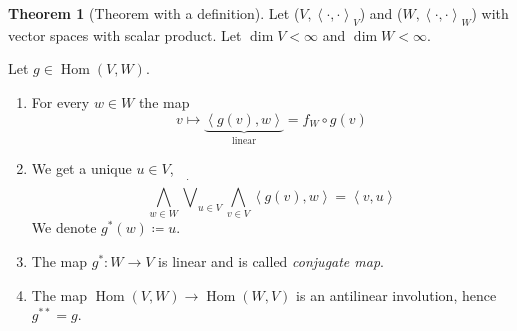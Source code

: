 \documentclass[a4paper,landscape,twocolumn]{article}
\newcommand\functional[1]{\left\langle{#1}\right\rangle}
\theoremstyle{definition}
\newtheorem{theorem}{Theorem}
\DeclareMathOperator\Hom{Hom} %
\begin{document}
\begin{theorem}[Theorem with a definition]
  Let ($V, \functional{\cdot,\cdot}_V$) and ($W, \functional{\cdot,\cdot}_W$) with vector spaces with scalar product.
  Let $\dim{V} < \infty$ and $\dim{W} < \infty$.

  Let $g \in \Hom(V, W)$.
  \begin{enumerate}
    \item For every $w \in W$ the map
      \[ v \mapsto \underbrace{\functional{g(v), w}}_{\text{linear}} = f_W \circ g(v) \]
    \item We get a unique $u \in V$,
      \[ \bigwedge_{w \in W} {\dot\bigvee}_{u \in V} \bigwedge_{v \in V} \functional{g(v), w} = \functional{v,u} \]
      We denote $g^*(w) \coloneqq u$.
    \item The map $g^*: W \to V$ is linear and is called \emph{conjugate map}.
    \item The map $\Hom(V,W) \to \Hom(W, V)$ is an antilinear involution,
      hence $g^{**} = g$.
  \end{enumerate}
\end{theorem}
\end{document}
